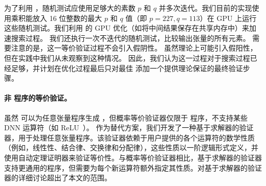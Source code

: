 为了利用 ，随机测试应使用足够大的素数 $p$ 和 $q$ 并多次迭代。我们目前的实现使用乘积能放入 16 位整数的最大 $p$ 和 $q$ 值（即 $p=227, q=113$）在 GPU 上运行这些随机测试。我们利用 \sys 的 GPU 优化（如将中间结果保存在共享内存中）来加速搜索过程。
我们还执行一次不迭代的随机测试，比较输出张量的所有元素。
需要注意的是，这一等价验证过程不会引入假阴性。
虽然理论上可能引入假阳性，但在实践中我们从未观察到这种情况。
因此，我们认为这一过程对于搜索过程已经足够，并计划在优化过程最后只对最佳 \graph 添加一个提供理论保证的最终验证步骤。

\paragraph{非 \lax 程序的等价验证。}虽然 \sys 可以为任意张量程序生成 \graphs，但概率等价验证器仅限于 \lax 程序，不支持某些 DNN 运算符（如 ReLU~\cite{relu}）。
作为替代方案，我们开发了一种基于求解器的验证器，用于处理任意张量程序。该验证器依赖于用户提供的各个运算符的数学性质（例如，线性性、结合律、交换律和分配律），这些性质以一阶逻辑形式定义，并使用自动定理证明器来验证等价性。与概率等价验证器相比，基于求解器的验证器支持更通用的程序，但需要为每个新运算符额外指定其性质。对基于求解器的验证器的详细讨论超出了本文的范围。
